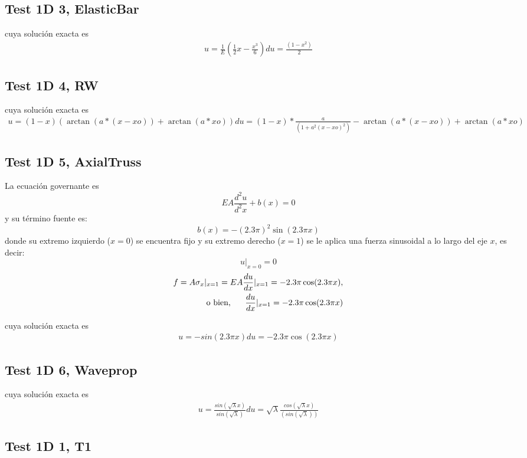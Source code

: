 \subsection{Test 1D 3, ElasticBar}
cuya solución exacta es
\begin{eqnarray}
    u = \frac{1}{E} ( \frac{1}{2} x - \frac{x^3}{6})
    du = \frac{( 1 -x^2 )}{2}
\end{eqnarray}

\subsection{Test 1D 4, RW}
cuya solución exacta es
\begin{eqnarray}
    u  = ( 1-x ) (\arctan(a*(x-xo))+\arctan(a*xo))
    du = ( 1-x )*\frac{a}{( 1 + a^2 (x-xo)^2 )} - \arctan(a*(x-xo)) + \arctan(a*xo)
\end{eqnarray}

\subsection{Test 1D 5, AxialTruss}
La ecuación governante es
\begin{equation}
    E A \frac{d^2 u}{d^2 x} + b(x) = 0
\end{equation}
y su término fuente es:
\begin{equation}
    b(x) = -(2.3 \pi)^2 \sin(2.3\pi x)
\end{equation}
donde su extremo izquierdo ($x=0$) se encuentra fijo y su extremo derecho ($x=1$) se le aplica una fuerza sinusoidal a lo largo del eje $x$, es decir:
\begin{equation}
    u|_{x=0} = 0
\end{equation}
\begin{equation}
    \begin{split}
        f = A \sigma_x|_{x=1} = E A \frac{d u}{d x} |_{x=1} = -2.3 \pi \cos(2.3 \pi x) , \\
        \mbox{ o bien, } \hspace{0.5cm} \frac{d u}{d x} |_{x=1} = -2.3 \pi \cos(2.3 \pi x)
    \end{split}
\end{equation}

cuya solución exacta es
\begin{eqnarray}
    u = -sin( 2.3 \pi x ) 
    du = - 2.3 \pi \cos( 2.3 \pi x )
\end{eqnarray}

\subsection{Test 1D 6, Waveprop}
cuya solución exacta es
\begin{eqnarray}
    u = \frac{ sin( \sqrt{\lambda} x) }{ sin( \sqrt{\lambda} ) }
    du = \sqrt{\lambda} \frac{ cos( \sqrt{\lambda} x )} {( sin( \sqrt{\lambda} ))}
\end{eqnarray}

\subsection{Test 1D 1, T1}

